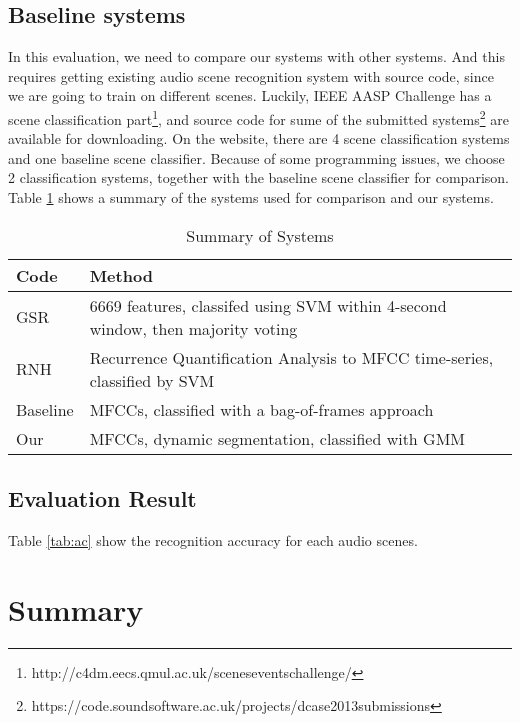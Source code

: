 \subsection{Baseline systems}
In this evaluation, we need to compare our systems with other systems. 
And this requires getting existing audio scene recognition system with source code, since we are going to train on different scenes. 
Luckily, IEEE AASP Challenge has a scene classification part\footnote{http://c4dm.eecs.qmul.ac.uk/sceneseventschallenge/}, and source code for sume of the submitted systems\footnote{https://code.soundsoftware.ac.uk/projects/dcase2013submissions} are available for downloading. 
On the website, there are 4 scene classification systems and one baseline scene classifier. 
Because of some programming issues, we choose 2 classification systems, together with the baseline scene classifier for comparison. 
Table \ref{tab:systems} shows a summary of the systems used for comparison and our systems. 

\begin{table}[htb]
\caption{Summary of Systems}
\begin{tabular}{ll}
\hline
 Code & Method \\
\hline
 GSR & 6669 features, classifed using SVM within 4-second window, then majority voting \\
 RNH & Recurrence Quantification Analysis to MFCC time-series, classified by SVM \\ 
 Baseline & MFCCs, classified with a bag-of-frames approach \\ 
 Our & MFCCs, dynamic segmentation, classified with GMM \\ 
\hline
\end{tabular}
\label{tab:systems}
\end{table}

\subsection{Evaluation Result}
Table \ref{tab:ac} show the recognition accuracy for each audio scenes. 

\begin{table}[htbp]
\centering
{}
\caption{Recognition Accuracy for 10 Audio Scenes}
\label{tab:ac}
\end{table}


\section{Summary}
